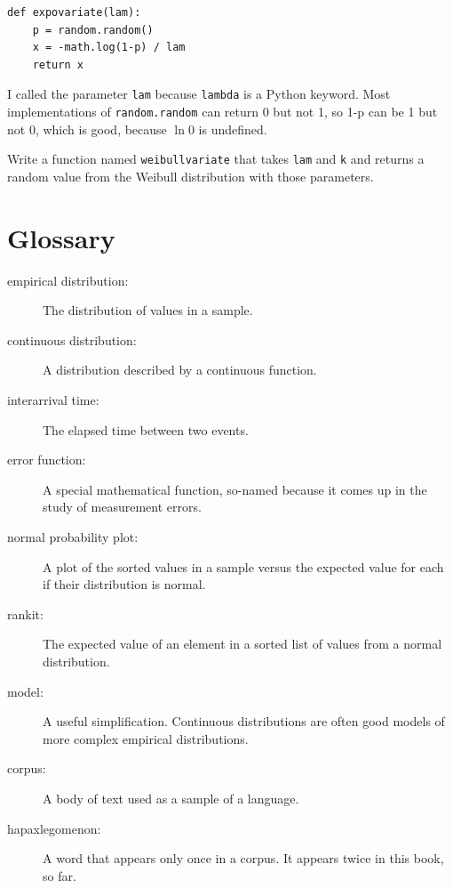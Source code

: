 \documentclass[12pt]{book}
\begin{document}
\begin{verbatim}
def expovariate(lam):
    p = random.random()
    x = -math.log(1-p) / lam
    return x
\end{verbatim}

I called the parameter \verb"lam" because \verb"lambda" is a Python
keyword.  Most implementations of {\tt random.random} can return 0 but
not 1, so 1-p can be 1 but not 0, which is good, because $\ln 0$ is
undefined.


\begin{ex}


Write a function named \verb"weibullvariate" that takes
\verb"lam" and \verb"k" and returns a random value from the Weibull
distribution with those parameters.

\end{ex}


\section{Glossary}

\begin{description}

\item[empirical distribution:] The distribution of values in a sample.

\item[continuous distribution:] A distribution described by a continuous
function.

\item[interarrival time:] The elapsed time between two events.

\item[error function:] A special mathematical function, so-named
  because it comes up in the study of measurement errors.

\item[normal probability plot:] A plot of the sorted values in a sample
versus the expected value for each if their distribution is normal.

\item[rankit:] The expected value of an element in a sorted list of
values from a normal distribution.

\item[model:] A useful simplification.  Continuous distributions are
often good models of more complex empirical distributions.

\item[corpus:] A body of text used as a sample of a language.

\item[hapaxlegomenon:] A word that appears only once in a corpus.
It appears twice in this book, so far.

\end{description}
\end{document}
